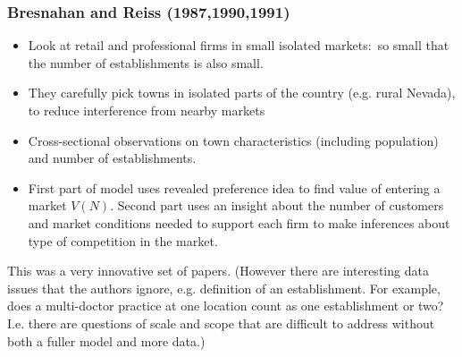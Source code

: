 \begin{frame}%

\frametitle{Bresnahan and Reiss (1987,1990,1991)}

\begin{itemize}
\item Look at retail and professional firms in small isolated markets:\ so
small that the number of establishments is also small.

\item They carefully pick towns in isolated parts of the country (e.g. rural
Nevada), to reduce interference from nearby markets

\item Cross-sectional observations on town characteristics (including
population) and number of establishments.

\item First part of model uses revealed preference idea to find value of
entering a market $V(N)$. Second part uses an insight about the number of
customers and market conditions needed to support each firm to make
inferences about type of competition in the market.
\end{itemize}

\bigskip

This was a very innovative set of papers. (However there are interesting
data issues that the authors ignore, e.g. definition of an establishment.
For example, does a multi-doctor practice at one location count as one
establishment or two? I.e. there are questions of scale and scope that are
difficult to address without both a fuller model and more data.)

\end{frame}%

